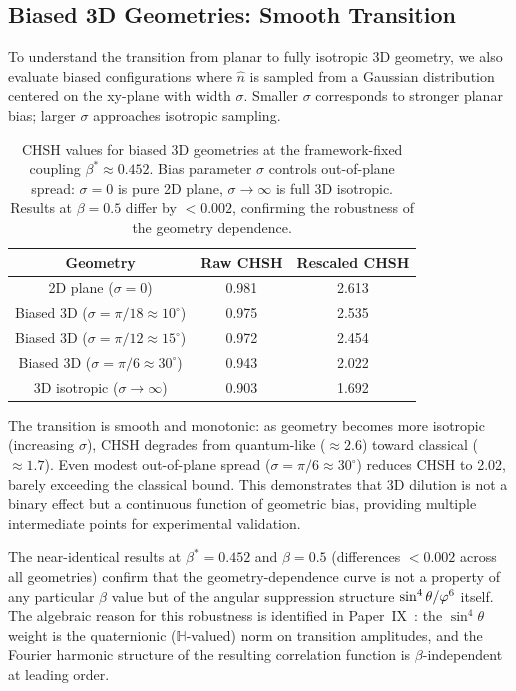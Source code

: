 \subsection*{Biased 3D Geometries: Smooth Transition}

To understand the transition from planar to fully isotropic 3D geometry, we also evaluate biased configurations where $\hat{n}$ is sampled from a Gaussian distribution centered on the xy-plane with width $\sigma$. Smaller $\sigma$ corresponds to stronger planar bias; larger $\sigma$ approaches isotropic sampling.

\begin{table}[h]
\centering
\caption{CHSH values for biased 3D geometries at the framework-fixed coupling
$\beta^*\approx0.452$. Bias parameter $\sigma$ controls out-of-plane spread:
$\sigma=0$ is pure 2D plane, $\sigma \to \infty$ is full 3D isotropic.
Results at $\beta=0.5$ differ by $<0.002$, confirming the robustness
of the geometry dependence.}
\label{P8:tab:biased3d_chsh}
\begin{tabular}{c|c|c}
\hline
Geometry & Raw CHSH & Rescaled CHSH \\
\hline
2D plane ($\sigma = 0$) & 0.981 & 2.613 \\
Biased 3D ($\sigma = \pi/18 \approx 10^\circ$) & 0.975 & 2.535 \\
Biased 3D ($\sigma = \pi/12 \approx 15^\circ$) & 0.972 & 2.454 \\
Biased 3D ($\sigma = \pi/6 \approx 30^\circ$) & 0.943 & 2.022 \\
3D isotropic ($\sigma \to \infty$) & 0.903 & 1.692 \\
\hline
\end{tabular}
\end{table}

The transition is smooth and monotonic: as geometry becomes more isotropic (increasing $\sigma$), CHSH degrades from quantum-like ($\approx 2.6$) toward classical ($\approx 1.7$). Even modest out-of-plane spread ($\sigma = \pi/6 \approx 30^\circ$) reduces CHSH to 2.02, barely exceeding the classical bound. This demonstrates that 3D dilution is not a binary effect but a continuous function of geometric bias, providing multiple intermediate points for experimental validation.

The near-identical results at $\beta^* = 0.452$ and $\beta = 0.5$ (differences $< 0.002$ across all geometries) confirm that the geometry-dependence curve is not a property of any particular $\beta$ value but of the angular suppression structure $\sin^4\theta/\varphi^6$ itself. The algebraic reason for this robustness is identified in Paper~IX~\cite{Paper9}: the $\sin^4\theta$ weight is the quaternionic ($\mathbb{H}$-valued) norm on transition amplitudes, and the Fourier harmonic structure of the resulting correlation function is $\beta$-independent at leading order.


